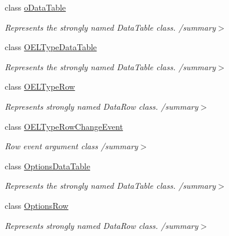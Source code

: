 \begin{DoxyCompactItemize}
class \hyperlink{class_env_int_1_1_win32_1_1_field_tech_1_1_manager_1_1_data_sets_1_1_guide_ware_mobile_data_set_1_1o_data_table}{o\+Data\+Table}
\begin{DoxyCompactList}\small\item\em Represents the strongly named Data\+Table class. /summary$>$ \end{DoxyCompactList}\item 
class \hyperlink{class_env_int_1_1_win32_1_1_field_tech_1_1_manager_1_1_data_sets_1_1_guide_ware_mobile_data_set_1_1_o_e_l_type_data_table}{O\+E\+L\+Type\+Data\+Table}
\begin{DoxyCompactList}\small\item\em Represents the strongly named Data\+Table class. /summary$>$ \end{DoxyCompactList}\item 
class \hyperlink{class_env_int_1_1_win32_1_1_field_tech_1_1_manager_1_1_data_sets_1_1_guide_ware_mobile_data_set_1_1_o_e_l_type_row}{O\+E\+L\+Type\+Row}
\begin{DoxyCompactList}\small\item\em Represents strongly named Data\+Row class. /summary$>$ \end{DoxyCompactList}\item 
class \hyperlink{class_env_int_1_1_win32_1_1_field_tech_1_1_manager_1_1_data_sets_1_1_guide_ware_mobile_data_set_1_1_o_e_l_type_row_change_event}{O\+E\+L\+Type\+Row\+Change\+Event}
\begin{DoxyCompactList}\small\item\em Row event argument class /summary$>$ \end{DoxyCompactList}\item 
class \hyperlink{class_env_int_1_1_win32_1_1_field_tech_1_1_manager_1_1_data_sets_1_1_guide_ware_mobile_data_set_1_1_options_data_table}{Options\+Data\+Table}
\begin{DoxyCompactList}\small\item\em Represents the strongly named Data\+Table class. /summary$>$ \end{DoxyCompactList}\item 
class \hyperlink{class_env_int_1_1_win32_1_1_field_tech_1_1_manager_1_1_data_sets_1_1_guide_ware_mobile_data_set_1_1_options_row}{Options\+Row}
\begin{DoxyCompactList}\small\item\em Represents strongly named Data\+Row class. /summary$>$ \end{DoxyCompactList}\item 

\end{DoxyCompactItemize}
